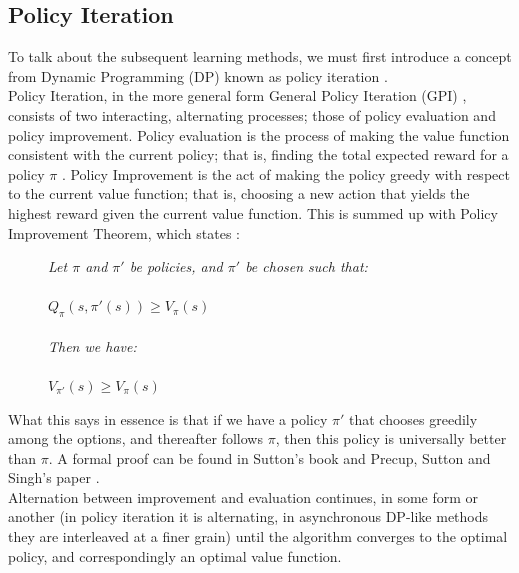 \documentclass[12pt]{article}
\begin{document}
\subsection{Policy Iteration}\label{polit}
To talk about the subsequent learning methods, we must first introduce a concept from Dynamic Programming (DP) known as policy iteration \autocite{Bellman:DynamicProgramming}.\\\newline
Policy Iteration, in the more general form General Policy Iteration (GPI)  \autocite{rlintrochap5}, consists of two interacting, alternating processes; those of policy evaluation and policy improvement. 
Policy evaluation is the process of making the value function consistent with the current policy; that is, finding the total expected reward for a policy $\pi$ \autocite{book:91856322}. Policy Improvement is the act of making the policy greedy with respect to the current value function; that is, choosing a new action that yields the highest reward given the current value function. This is summed up with Policy Improvement Theorem, which states \autocite{watkins1989learning,rlintrochap4,10.1007/BFb0026709}:
\begin{figure}[H]
    \centering
    \textit{Let $\pi$ and $\pi'$ be policies, and $\pi'$ be chosen such that:}\\
    ~\\
    $Q_\pi(s,\pi'(s))\geq V_\pi(s)$\\ ~\\
    \textit{Then we have:}\\ ~\\
    $V_{\pi'}(s) \geq V_\pi(s)$
\end{figure}
What this says in essence is that if we have a policy $\pi'$ that chooses greedily among the options, and thereafter follows $\pi$, then this policy is universally better than $\pi$. A formal proof can be found in Sutton's book \autocite{rlintrochap4} and Precup, Sutton and Singh's paper \autocite{10.1007/BFb0026709}.\\\newline
Alternation between improvement and evaluation continues, in some form or another (in policy iteration it is alternating, in asynchronous DP-like methods \autocite{barto1995learning} they are interleaved at a finer grain) until the algorithm converges to the optimal policy, and correspondingly an optimal value function.
\end{document}
